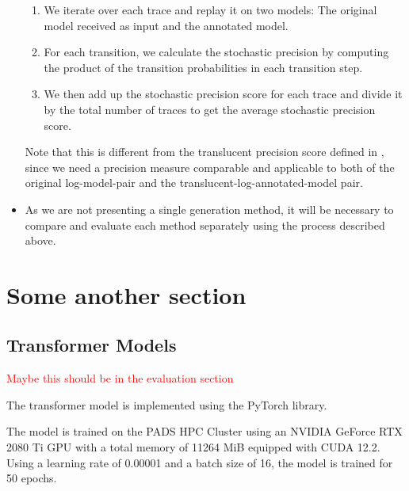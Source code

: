 \begin{itemize}
    \begin{enumerate}
        \item We iterate over each trace and replay it on two models: The original model received as input and the annotated model.
        \item For each transition, we calculate the stochastic precision by computing the product of the transition probabilities in each transition step.
        \item We then add up the stochastic precision score for each trace and divide it by the total number of traces to get the average stochastic precision score.
    \end{enumerate}

    Note that this is different from the translucent precision score defined in \cite{translucent-precision}, since we need a precision measure comparable and applicable to both of the original log-model-pair and the translucent-log-annotated-model pair.

    \item As we are not presenting a single generation method, it will be necessary to compare and evaluate each method separately using the process described above.

\end{itemize}

\section{Some another section}
\subsection{Transformer Models}

\textcolor{red}{Maybe this should be in the evaluation section}

The transformer model is implemented using the PyTorch library. 

The model is trained on the PADS HPC Cluster using an NVIDIA GeForce RTX 2080 Ti GPU with a total memory of 11264 MiB equipped with CUDA 12.2. Using a learning rate of 0.00001 and a batch size of 16, the model is trained for 50 epochs.

